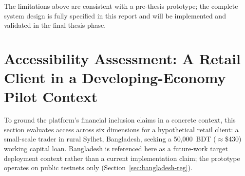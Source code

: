 \documentclass[12pt,a4paper]{report}
\begin{document}
The limitations above are consistent with a pre-thesis prototype; the complete system design is fully specified in this report and will be implemented and validated in the final thesis phase.

\section{Accessibility Assessment: A Retail Client in a Developing-Economy Pilot Context}

To ground the platform's financial inclusion claims in a concrete context, this section evaluates access across six dimensions for a hypothetical retail client: a small-scale trader in rural Sylhet, Bangladesh, seeking a 50,000~BDT ($\approx$\$430) working capital loan. Bangladesh is referenced here as a future-work target deployment context rather than a current implementation claim; the prototype operates on public testnets only (Section~\ref{sec:bangladesh-reg}).
\end{document}
